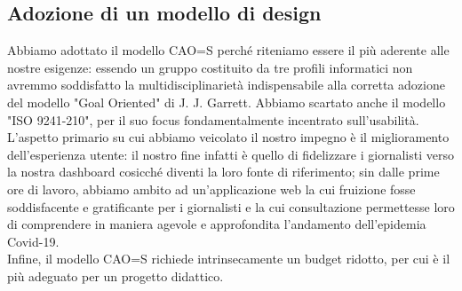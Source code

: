 \subsection{Adozione di un modello di design}

Abbiamo adottato il modello CAO=S perché riteniamo essere il più aderente alle nostre esigenze: essendo un gruppo costituito da tre profili informatici non avremmo soddisfatto la multidisciplinarietà indispensabile alla corretta adozione del modello "Goal Oriented" di J. J. Garrett. Abbiamo scartato anche il modello "ISO 9241-210", per il suo focus fondamentalmente incentrato sull'usabilità. L'aspetto primario su cui abbiamo veicolato il nostro impegno è il miglioramento dell'esperienza utente: il nostro fine infatti è quello di fidelizzare i giornalisti verso la nostra dashboard cosicché diventi la loro fonte di riferimento; sin dalle prime ore di lavoro, abbiamo ambito ad un'applicazione web la cui fruizione fosse soddisfacente e gratificante per i giornalisti e la cui consultazione permettesse loro di comprendere in maniera agevole e approfondita l'andamento dell'epidemia Covid-19.\\
Infine, il modello CAO=S richiede intrinsecamente un budget ridotto, per cui è il più adeguato per un progetto didattico. 